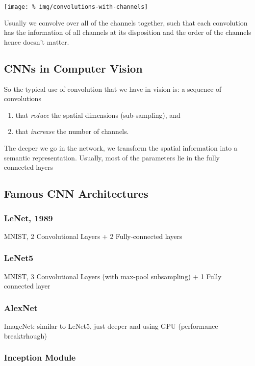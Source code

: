 \documentclass[a2paper,8pt]{extarticle}
\begin{document}
\begin{landscape}
\begin{multicols*}{7}
\begin{center}
  \texttt{[image: \%
img/convolutions-with-channels]}
\end{center}

Usually we convolve over all of the channels together, such that each
convolution has the information of all channels at its disposition and the
order of the channels hence doesn't matter.

\subsection{CNNs in Computer Vision}

So the typical use of convolution that we have in vision is: a sequence of
convolutions
\begin{enumerate}
  \item that \emph{reduce} the spatial dimensions (sub-sampling), and
  \item that \emph{increase} the number of channels.
\end{enumerate}
The deeper we go in the network, we transform the spatial information into a
semantic representation. Usually, most of the parameters lie in the fully
connected layers

\subsection{Famous CNN Architectures}

\subsubsection{LeNet, 1989}

MNIST, 2 Convolutional Layers + 2 Fully-connected layers

\subsubsection{LeNet5}

MNIST, 3 Convolutional Layers (with max-pool subsampling) + 1 Fully connected
layer

\subsubsection{AlexNet}

ImageNet: similar to LeNet5, just deeper and using GPU (performance
breaktrhough)

\subsubsection{Inception Module}


\end{multicols*}
\end{landscape}
\end{document}
